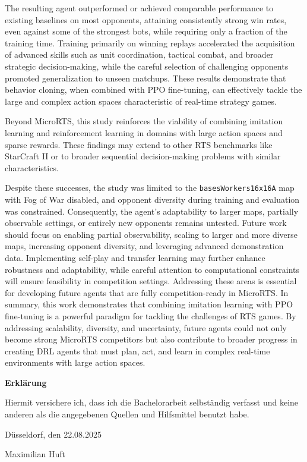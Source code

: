 \documentclass[10pt,twocolumn,letterpaper]{article}
\begin{document}
The resulting agent outperformed or achieved comparable performance to existing baselines on most opponents, attaining consistently strong win rates, even against some of the strongest bots, while requiring only a fraction of the training time. Training primarily on winning replays accelerated the acquisition of advanced skills such as unit coordination, tactical combat, and broader strategic decision-making, while the careful selection of challenging opponents promoted generalization to unseen matchups. These results demonstrate that behavior cloning, when combined with PPO fine-tuning, can effectively tackle the large and complex action spaces characteristic of real-time strategy games.

Beyond MicroRTS, this study reinforces the viability of combining imitation learning and reinforcement learning in domains with large action spaces and sparse rewards. These findings may extend to other RTS benchmarks like StarCraft II or to broader sequential decision-making problems with similar characteristics.

Despite these successes, the study was limited to the \texttt{basesWorkers16x16A} map with Fog of War disabled, and opponent diversity during training and evaluation was constrained. Consequently, the agent’s adaptability to larger maps, partially observable settings, or entirely new opponents remains untested. Future work should focus on enabling partial observability, scaling to larger and more diverse maps, increasing opponent diversity, and leveraging advanced demonstration data. Implementing self-play and transfer learning may further enhance robustness and adaptability, while careful attention to computational constraints will ensure feasibility in competition settings. Addressing these areas is essential for developing future agents that are fully competition-ready in MicroRTS.
In summary, this work demonstrates that combining imitation learning with PPO fine-tuning is a powerful paradigm for tackling the challenges of RTS games. By addressing scalability, diversity, and uncertainty, future agents could not only become strong MicroRTS competitors but also contribute to broader progress in creating DRL agents that must plan, act, and learn in complex real-time environments with large action spaces.



{\small


}

\onecolumn
\pagebreak\noindent
\textbf{\LARGE Erkl\"arung}

\bigskip\bigskip
\noindent 
Hiermit versichere ich, dass ich die   Bachelorarbeit selbst\"andig verfasst und keine
anderen als die angegebenen Quellen und Hilfsmittel benutzt habe.

\bigskip
\noindent
D\"usseldorf, den 22.08.2025

\bigskip\bigskip\bigskip
\noindent
{Maximilian Huft}

\newpage
\end{document}
